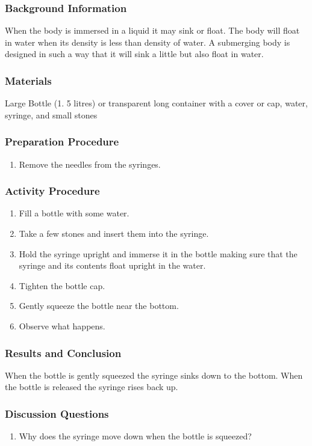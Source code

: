 \subsubsection*{Background Information}
When the body is immersed in a liquid it may sink or float. The body will float in water when its density is less than density of water. A submerging body is designed in such a way that it will sink a little but also float in water. 

\subsubsection*{Materials}
Large Bottle (1. 5 litres) or transparent long container with a cover or cap, water, syringe, and small stones

\subsubsection*{Preparation Procedure}
\begin{enumerate}
\item{Remove the needles from the syringes.}
\end{enumerate}

\subsubsection*{Activity Procedure}
\begin{enumerate}
\item{Fill a bottle with some water.}
\item{Take a few stones and insert them into the syringe.}
\item{Hold the syringe upright and immerse it in the bottle making sure that the syringe and its contents float upright in the water.}
\item{Tighten the bottle cap.}
\item{Gently squeeze the bottle near the bottom.} 
\item{Observe what happens.}
\end{enumerate}

\subsubsection*{Results and Conclusion}
When the bottle is gently squeezed the syringe sinks down to the bottom. When the bottle is released the syringe rises back up. 

\subsubsection*{Discussion Questions}
\begin{enumerate}
\item{Why does the syringe move down when the bottle is squeezed?}
\end{enumerate}


